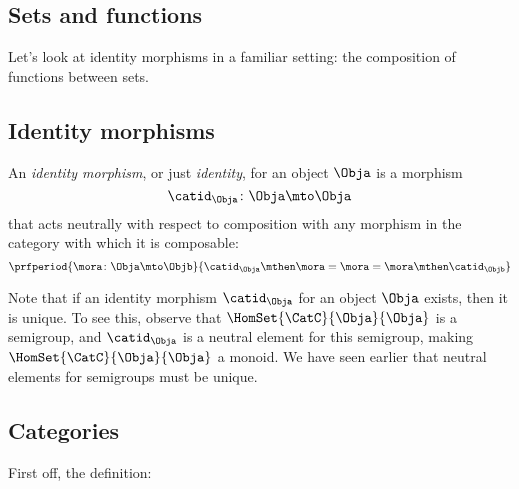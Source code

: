 \subsection{Sets and functions}

Let's look at identity morphisms in a familiar setting: the composition of functions between sets.

\subsection{Identity morphisms}

\begin{ctdefinition}
	\label{def:identity-morphism}
	An \emph{identity morphism}, or just \emph{identity}, for an object $\Obja$
	is a morphism
	\begin{equation}
		\catid_{\Obja}\colon \Obja \mto \Obja
	\end{equation}
	that acts neutrally with respect to composition with any morphism in the category with which it is composable:
	\begin{equation}
		\prfperiod{
			\mora \colon \Obja \mto \Objb
		}{
			\catid_\Obja \mthen \mora= \mora = \mora \mthen \catid_\Objb
		}
	\end{equation}
\end{ctdefinition}

Note that if an identity morphism $\catid_{\Obja}$ for an object $\Obja$ exists, then it is unique.
To see this, observe that $\HomSet{\CatC}{\Obja}{\Obja}$ is a semigroup, and $\catid_{\Obja}$ is a neutral element for this semigroup, making $\HomSet{\CatC}{\Obja}{\Obja}$ a monoid.
We have seen earlier that neutral elements for semigroups must be unique.

\subsection{Categories}

First off, the definition:


